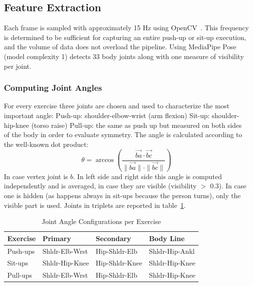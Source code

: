 \documentclass[conference]{IEEEtran}
\begin{document}
\subsection{Feature Extraction}

Each frame is sampled with approximately 15 Hz using OpenCV~\cite{bradski2000}. This frequency is determined to be sufficient for capturing an entire push-up or sit-up execution, and the volume of data does not overload the pipeline. Using MediaPipe Pose (model complexity 1) detects 33 body joints along with one measure of visibility per joint.

\subsubsection{Computing Joint Angles}
For every exercise three joints are chosen and used to characterize the most important angle:
Push-up: shoulder-elbow-wrist (arm flexion)
Sit-up: shoulder-hip-knee (torso raise)
Pull-up: the same as push up but measured on both sides of the body in order to evaluate symmetry.
The angle is calculated according to the well-known dot product:
\begin{equation}
\theta = \arccos\!\left(\frac{\vec{ba} \cdot \vec{bc}}{\|\vec{ba}\| \cdot \|\vec{bc}\|}\right)
\label{eq:angle}
\end{equation}
In case vertex joint is $b$. In left side and right side this angle is computed independently and is averaged, in case they are visible (visibility $>$ 0.3). In case one is hidden (as happens always in sit-ups because the person turns), only the visible part is used. Joints in triplets are reported in table~\ref{tab:joints}.

\begin{table}[ht]
\caption{Joint Angle Configurations per Exercise}
\label{tab:joints}
\centering
\renewcommand{\arraystretch}{1.15}
\begin{tabular}{@{}llll@{}}
\toprule
\textbf{Exercise} & \textbf{Primary} & \textbf{Secondary} & \textbf{Body Line} \\
\midrule
Push-ups & Shldr-Elb-Wrst & Hip-Shldr-Elb & Shldr-Hip-Ankl \\
Sit-ups  & Shldr-Hip-Knee & Hip-Shldr-Knee & Shldr-Hip-Knee \\
Pull-ups & Shldr-Elb-Wrst & Hip-Shldr-Elb & Shldr-Hip-Knee \\
\bottomrule
\end{tabular}
\end{table}
\end{document}
